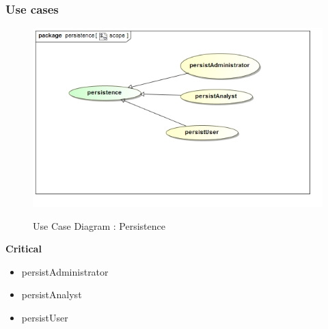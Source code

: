 \documentclass{article}
\begin{document}
		\subsubsection{Use cases}

		\begin{figure}[H]
		\includegraphics[width=\textwidth]{images/uc__persistence__scope.jpg}  \\
		\caption{Use Case Diagram : Persistence}
		\end{figure}

		\begin{flushleft}
			\textbf{Critical}
				\begin{itemize}
					\item persistAdministrator
					\item persistAnalyst
					\item persistUser
				\end{itemize}
		\end{flushleft}



\end{document}
